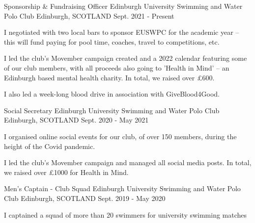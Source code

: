 \begin{cventries}
  \cventry
    {Sponsorship \& Fundraising Officer} %
    {Edinburgh University Swimming and Water Polo Club} %
    {Edinburgh, SCOTLAND} %
    {Sept. 2021 - Present} %
    {
      \begin{cvitems} %
        \item I negotiated with two local bars to sponsor EUSWPC for the academic year -- this will fund paying for pool time, coaches, travel to competitions, etc.
        \item I led the club's Movember campaign created and a 2022 calendar featuring some of our club members, with all proceeds also going to 'Health in Mind' -- an Edinburgh based mental health charity. In total, we raised over £600.
        \item I also led a week-long blood drive in association with GiveBlood4Good.
      \end{cvitems}
    }
    
  \cventry
    {Social Secretary} %
    {Edinburgh University Swimming and Water Polo Club} %
    {Edinburgh, SCOTLAND} %
    {Sept. 2020 - May 2021} %
    {
      \begin{cvitems} %
        \item I organised online social events for our club, of over 150 members, during the height of the Covid pandemic.
        \item I led the club's Movember campaign and managed all social media posts. In total, we raised over £1000 for Health in Mind.
      \end{cvitems}
    }
    
  \cventry
    {Men's Captain - Club Squad} %
    {Edinburgh University Swimming and Water Polo Club} %
    {Edinburgh, SCOTLAND} %
    {Sept. 2019 - May 2020} %
    {
      \begin{cvitems} %
        \item I captained a squad of more than 20 swimmers for university swimming matches
      \end{cvitems}
    }
\end{cventries}

